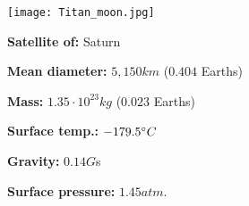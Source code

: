 \begin{tcolorbox}[colback=red!5,colframe=DarkRed!40!black,title=Titan \cite{Titan}]

{\centering
\texttt{[image: Titan\_moon.jpg]}
\par}

\textbf{Satellite of:} Saturn

\textbf{Mean diameter:} $5,150 km$ ($0.404$ Earths)

\textbf{Mass:} $1.35\cdot 10^{23} kg$ ($0.023$ Earths)

\textbf{Surface temp.:} $-179.5 \degree C$

\textbf{Gravity:} $0.14 G$s

\textbf{Surface pressure:} $1.45 atm.$
\end{tcolorbox}

